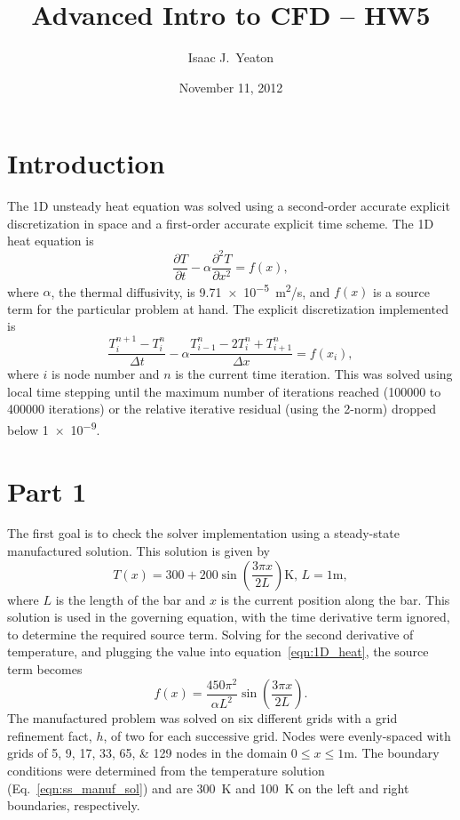 \documentclass[11pt, letterpaper]{article}
\title{Advanced Intro to CFD -- HW5}
\author{Isaac J.~Yeaton}
\date{November 11, 2012}
\newcommand{\p}{\partial}
\newcommand{\eqn}[1]{equation~\eqref{#1}}
\begin{document}
\maketitle
\thispagestyle{empty}


\section{Introduction}

The 1D unsteady heat equation was solved using a second-order accurate explicit
discretization in space and a first-order accurate explicit time scheme.
The 1D heat equation is
%
\begin{equation}
	\label{eqn:1D_heat}
	\frac{\p T}{\p t} - \alpha \frac{\p^2 T}{\p x^2} = f(x),
\end{equation}
%
where $\alpha$, the thermal diffusivity, is \SI{9.71e-5}{m^2/s}, and $f(x)$ is
a source term for the particular problem at hand.  The explicit discretization
implemented is
%
\begin{equation}
	\label{eqn:exp_disc}
	\frac{T_i^{n+1} - T_i^n}{\Delta t} - 
	\alpha \frac{T_{i-1}^n - 2T_i^n + T_{i+1}^n}{\Delta x} = f(x_i),
\end{equation}
%
where $i$ is node number and $n$ is the current time iteration.  This was solved
using local time stepping until the maximum number of iterations reached (\num{100000}
to \num{400000} iterations) or the relative iterative residual (using the 2-norm)
dropped below \num{1e-9}.


\section{Part 1}

The first goal is to check the solver implementation using a steady-state manufactured
solution.  This solution is given by
%
\begin{equation}
	\label{eqn:ss_manuf_sol}
	T(x) = 300 + 200 \sin \left( \frac{3 \pi x}{2 L} \right) \mbox{K,   } L = 1\mathrm{m},
\end{equation}
%
where $L$ is the length of the bar and $x$ is the current position along the bar.
This solution is used in the governing equation, with the time derivative term ignored, to
determine the required source term.  Solving for the second derivative of temperature,
and plugging the value into \eqn{eqn:1D_heat}, the source term becomes
%
\begin{equation}
	\label{eqn:ss_manuf_fx}
	f(x) = \frac{450 \pi^2}{\alpha L^2} \sin \left( \frac{3 \pi x}{2 L} \right).
\end{equation}
%
The manufactured problem was solved on six different grids with a grid refinement fact, $h$,
of two for each successive grid.  Nodes were evenly-spaced with grids of
\numlist{5;9;17;33;65;129} nodes in the domain $0 \le x \le 1$\si{m}.  The boundary
conditions were determined from the temperature solution (Eq.~\ref{eqn:ss_manuf_sol}) and are
\SI{300}{K} and \SI{100}{K} on the left and right boundaries, respectively.
\end{document}
